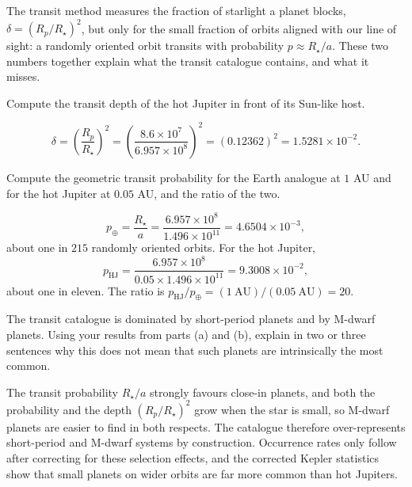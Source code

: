 
The transit method measures the fraction of starlight a planet blocks, $\delta = (R_p/R_\star)^2$, but only for the small fraction of orbits aligned with our line of sight: a randomly oriented orbit transits with probability $p \approx R_\star/a$.
These two numbers together explain what the transit catalogue contains, and what it misses.

\parti Compute the transit depth of the hot Jupiter in front of its Sun-like host.

\begin{solution}
\[
\delta = \left(\frac{R_p}{R_\star}\right)^2
= \left(\frac{8.6\times10^{7}}{6.957\times10^{8}}\right)^2
= (0.12362)^2 = 1.5281\times10^{-2}.
\]
\end{solution}

\parti Compute the geometric transit probability for the Earth analogue at $1$ AU and for the hot Jupiter at $0.05$ AU, and the ratio of the two.

\begin{solution}
\[
p_\oplus = \frac{R_\star}{a} = \frac{6.957\times10^{8}}{1.496\times10^{11}} = 4.6504\times10^{-3},
\]
about one in $215$ randomly oriented orbits.
For the hot Jupiter,
\[
p_\mathrm{HJ} = \frac{6.957\times10^{8}}{0.05 \times 1.496\times10^{11}} = 9.3008\times10^{-2},
\]
about one in eleven.
The ratio is $p_\mathrm{HJ}/p_\oplus = (1\ \mathrm{AU})/(0.05\ \mathrm{AU}) = 20$.
\end{solution}

\parti The transit catalogue is dominated by short-period planets and by M-dwarf planets. Using your results from parts (a) and (b), explain in two or three sentences why this does not mean that such planets are intrinsically the most common.

\begin{solution}
The transit probability $R_\star/a$ strongly favours close-in planets, and both the probability and the depth $(R_p/R_\star)^2$ grow when the star is small, so M-dwarf planets are easier to find in both respects.
The catalogue therefore over-represents short-period and M-dwarf systems by construction.
Occurrence rates only follow after correcting for these selection effects, and the corrected Kepler statistics show that small planets on wider orbits are far more common than hot Jupiters.
\end{solution}


